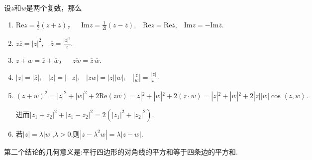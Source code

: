 \documentclass[../../main.tex]{subfiles}%
\begin{document}
\begin{proposition}[复数运算性质]\label{proposition:复数运算性质}
设\(z\)和\(w\)是两个复数，那么
\begin{enumerate}[(1)]
\item\label{proposition:复数运算性质-1} \(\mathrm{Re}z = \frac{1}{2}(z + \overline{z})\)，\(\quad \mathrm{Im}z = \frac{1}{2\mathrm{i}}(z - \overline{z})\),$\quad \mathrm{Re}z=\mathrm{Re}\overline{z}$,$\quad \mathrm{Im}z=-\mathrm{Im}\overline{z}$.

\item\label{proposition:复数运算性质-2} \(z\overline{z} = |z|^2\),\(\quad \overline{z} = \frac{|z|^2}{z}\).

\item\label{proposition:复数运算性质-3} \(\overline{z + w} = \overline{z} + \overline{w}\)，\(\quad \overline{zw} = \overline{z}\,\overline{w}\).

\item\label{proposition:复数运算性质-4} \(|z| = |\overline{z}|\),$\quad |z|=|-z|$,$\quad |zw|=|z||w|$,$\quad \left| \frac{z}{w} \right|=\frac{\left| z \right|}{\left| w \right|}$.

\item\label{proposition:复数运算性质-5} $(z+w)^2=|z|^2+|w|^2+2\text{Re}(z\overline{w})=z|^2+|w|^2+2(z\cdot w)=|z|^2+|w|^2+2|z||w|\cos\left< z,w \right> .$

进而$\left| z_1+z_2 \right|^2+\left| z_1-z_2 \right|^2=2\left( \left| z_1 \right|^2+\left| z_2 \right|^2 \right) .$

\item\label{proposition:复数运算性质-6} 若$|z|=\lambda|w|$,$\lambda>0$,则$|z-\lambda^2 w|=\lambda|z-w|.$
\end{enumerate}
\end{proposition}
\begin{note}
第二个结论的几何意义是:平行四边形的对角线的平方和等于四条边的平方和.
\end{note}
\end{document}
